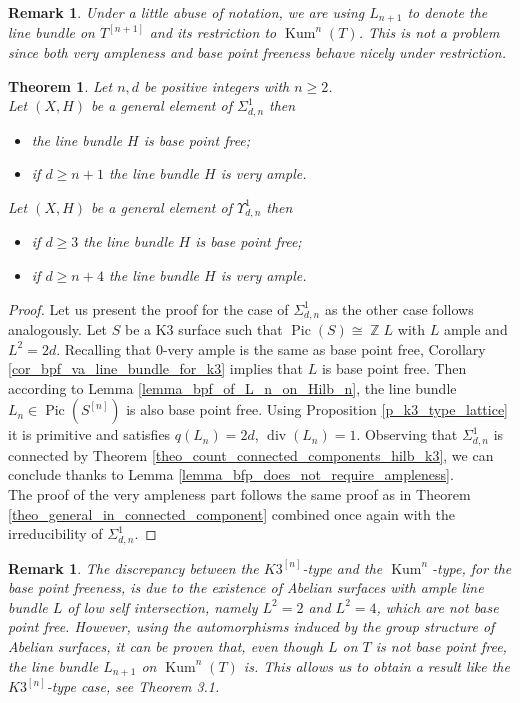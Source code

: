 \documentclass{article}
\DeclareMathOperator{\bZ}{\mathbb{Z}}
\DeclareMathOperator{\Pic}{Pic}
\DeclareMathOperator{\Kum}{Kum}
\DeclareMathOperator{\Div}{div}
\newcommand{\hilb}[2][n]{#2^{[#1]}}
\newtheorem{remark}[proposition]{Remark}
\newtheorem{theorem}[proposition]{Theorem}
\begin{document}
\begin{remark}
    Under a little abuse of notation, we are using $L_{n+1}$ to denote the line bundle on $\hilb[n+1]{T}$ and its restriction to $\Kum^n(T)$. This is not a problem since both very ampleness and base point freeness behave nicely under restriction.
\end{remark}

\begin{theorem}
    
    Let $n,d$ be positive integers with $n\geq 2$.\\
    Let $(X,H)$ be a general element of $\Sigma_{d,n}^1$ then 
    \begin{itemize}
        \item the line bundle $H$ is base point free;
        \item if $d\geq n+1$ the line bundle $H$ is very ample.
    \end{itemize}
    Let $(X,H)$ be a general element of $\Upsilon_{d,n}^1$ then
    \begin{itemize}
        \item if $d\geq 3$ the line bundle $H$ is base point free;
        \item if $d\geq n+4$ the line bundle $H$ is very ample.
    \end{itemize}
\end{theorem}

\begin{proof}
    Let us present the proof for the case of $\Sigma_{d,n}^1$ as the other case follows analogously. Let $S$ be a K3 surface such that $\Pic(S)\cong \bZ L$ with $L$ ample and $L^2=2d$. Recalling that $0$-very ample is the same as base point free, Corollary \ref{cor_bpf_va_line_bundle_for_k3} implies that $L$ is base point free. Then according to Lemma \ref{lemma_bpf_of_L_n_on_Hilb_n}, the line bundle $L_n\in \Pic(\hilb{S})$ is also base point free. Using Proposition \ref{p_k3_type_lattice} it is primitive and satisfies $q(L_n)=2d$, $\Div(L_n)=1$. Observing that $\Sigma_{d,n}^1$ is connected by Theorem \ref{theo_count_connected_components_hilb_k3}, we can conclude thanks to Lemma \ref{lemma_bfp_does_not_require_ampleness}.\\
    The proof of the very ampleness part follows the same proof as in Theorem \ref{theo_general_in_connected_component} combined once again with the irreducibility of $\Sigma_{d,n}^1$.
\end{proof}

\begin{remark}
    The discrepancy between the $\hilb{K3}$-type and the $\Kum^n$-type, for the base point freeness, is due to the existence of Abelian surfaces with ample line bundle $L$ of low self intersection, namely $L^2=2$ and $L^2=4$, which are not base point free. However, using the automorphisms induced by the group structure of Abelian surfaces, it can be proven that, even though $L$ on $T$ is not base point free, the line bundle $L_{n+1}$ on $\Kum^n(T)$ is. This allows us to obtain a result like the $\hilb{K3}$-type case, see \cite{Varesco_2023} Theorem 3.1.
\end{remark}
\end{document}
